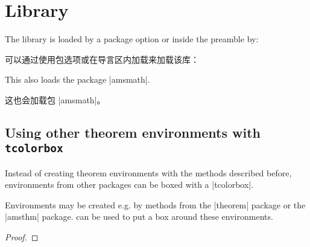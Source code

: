 \setcounter{section}{17}
\section{Library }\label{sec:theorems}%
%
The library is loaded by a package option or inside the preamble by:

可以通过使用包选项或在导言区内加载来加载该库：
\begin{dispListing}
\end{dispListing}
This also loads the package |amsmath|.

这也会加载包 |amsmath|。

% 
% 


% 
\subsection{Using other theorem environments with \texttt{tcolorbox}}\label{subsec:theorems_other}

Instead of creating theorem environments with the methods described before,
environments from other packages can be boxed with a |tcolorbox|.

Environments may be created e.g. by methods from the |theorem| package or
the |amsthm| package.  can be used to put a box
around these environments.


\begin{dispExample}
\begin{lem}
  \lipsum[2]
\end{lem}

\lipsum[3]

\begin{proof}
  \lipsum*[4]
\end{proof}
\end{dispExample}
